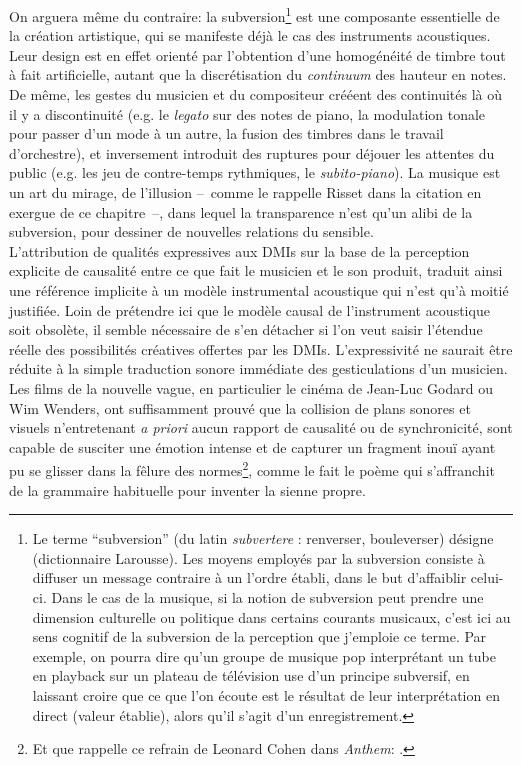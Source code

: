 \indent On arguera même du contraire: la subversion\footnote{Le terme ``subversion'' (du latin \textit{subvertere} : renverser, bouleverser) désigne  (dictionnaire Larousse). Les moyens employés par la subversion consiste à diffuser un message contraire à un l'ordre établi, dans le but d'affaiblir celui-ci. Dans le cas de la musique, si la notion de subversion peut prendre une dimension culturelle ou politique dans certains courants musicaux, c'est ici au sens cognitif de la subversion de la perception que j'emploie ce terme. Par exemple, on pourra dire qu'un groupe de musique pop interprétant un tube en playback sur un plateau de télévision use d'un principe subversif, en laissant croire que ce que l'on écoute est le résultat de leur interprétation en direct (valeur établie), alors qu'il s'agit d'un enregistrement. } est une composante essentielle de la création artistique, qui se manifeste déjà le cas des instruments acoustiques. Leur design est en effet orienté par l'obtention d'une homogénéité de timbre tout à fait artificielle, autant que la discrétisation du \textit{continuum} des hauteur en notes. De même, les gestes du musicien et du compositeur crééent des continuités là où il y a discontinuité (e.g. le \textit{legato} sur des notes de piano, la modulation tonale pour passer d'un mode à un autre, la fusion des timbres dans le travail d'orchestre),  et inversement introduit des ruptures pour déjouer les attentes du public (e.g. les jeu de contre-temps rythmiques, le \textit{subito-piano}). La musique est un art du mirage, de l'illusion --~comme le rappelle Risset dans la citation en exergue de ce chapitre~--, dans lequel la transparence n'est qu'un alibi de la subversion, pour dessiner de nouvelles relations du sensible.\\
\indent L'attribution de qualités expressives aux \glspl{DMI} sur la base de la perception explicite de causalité entre ce que fait le musicien et le son produit, traduit ainsi une référence implicite à un modèle instrumental acoustique qui n'est qu'à moitié justifiée. Loin de prétendre ici que le modèle causal de l'instrument acoustique soit obsolète, il semble nécessaire de s'en détacher si l'on veut saisir l'étendue réelle des possibilités créatives offertes par les \glspl{DMI}. L'expressivité ne saurait être réduite à la simple traduction sonore immédiate des gesticulations d'un musicien. Les films de la nouvelle vague, en particulier le cinéma de Jean-Luc Godard ou Wim Wenders, ont suffisamment prouvé que la collision de plans sonores et visuels n'entretenant \textit{a priori} aucun rapport de causalité ou de synchronicité, sont capable de susciter une émotion intense et de capturer un fragment inouï ayant pu se glisser dans la fêlure des normes\footnote{Et que rappelle ce refrain de Leonard Cohen dans \textit{Anthem}: .}, comme le fait le poème qui s'affranchit de la grammaire habituelle pour inventer la sienne propre.\\

